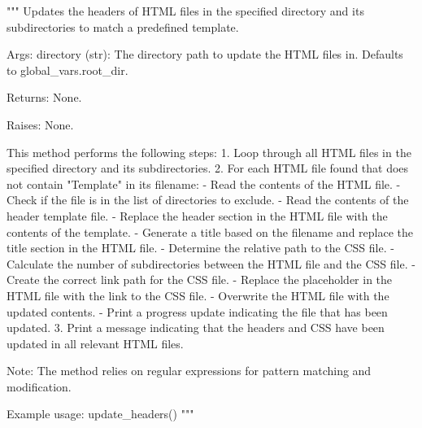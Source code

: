 \begin{codebox}[MMORPDND.update\_headers(self, directory=global\_vars.root\_dir)]
"""
Updates the headers of HTML files in the specified directory and its subdirectories to match a predefined template.

Args:
	directory (str): The directory path to update the HTML files in. Defaults to global_vars.root_dir.

Returns:
	None.

Raises:
	None.

This method performs the following steps:
	1. Loop through all HTML files in the specified directory and its subdirectories.
	2. For each HTML file found that does not contain "Template" in its filename:
		- Read the contents of the HTML file.
		- Check if the file is in the list of directories to exclude.
		- Read the contents of the header template file.
		- Replace the header section in the HTML file with the contents of the template.
		- Generate a title based on the filename and replace the title section in the HTML file.
		- Determine the relative path to the CSS file.
		- Calculate the number of subdirectories between the HTML file and the CSS file.
		- Create the correct link path for the CSS file.
		- Replace the placeholder in the HTML file with the link to the CSS file.
		- Overwrite the HTML file with the updated contents.
		- Print a progress update indicating the file that has been updated.
	3. Print a message indicating that the headers and CSS have been updated in all relevant HTML files.

Note: 
	The method relies on regular expressions for pattern matching and modification.

Example usage:
	update_headers()
"""
\end{codebox}


